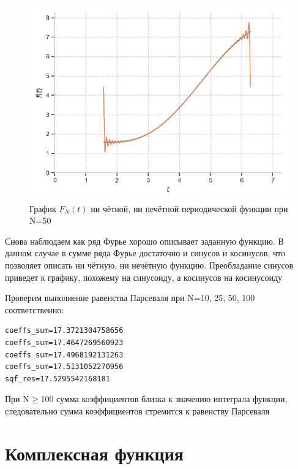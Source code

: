 \documentclass[a4paper, 16pt]{article}
\begin{document}
\begin{figure}[!htb]
    \centering
    \includegraphics[scale=0.8]{fur_evodd_n=50.png}
    \captionsetup{skip=0pt}
    \caption{График $F_N(t)$ ни чётной, ни нечётной периодической функции при N=50}
    \label{Рис:34}
\end{figure}


\noindent Снова наблюдаем как ряд Фурье хорошо описывает заданную функцию. В данном случае
в сумме ряда Фурье достаточно и синусов и косинусов, что позволяет описать ни чётную, ни 
нечётную функцию. Преобладание синусов приведет к графику, похожему на синусоиду, а косинусов
на косинусоиду


\noindent Проверим выполнение равенства Парсеваля при N=10, 25, 50, 100 соответственно:
\begin{lstlisting}
coeffs_sum=17.3721304758656
coeffs_sum=17.4647269560923
coeffs_sum=17.4968192131263
coeffs_sum=17.5131052270956
sqf_res=17.5295542168181
\end{lstlisting}


\noindent При N$\geq$100 сумма коэффициентов близка к значению
интеграла функции, следовательно сумма коэффициентов стремится к равенству Парсеваля


\newpage
\section{Комплексная функция}
\end{document}

